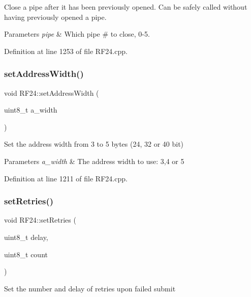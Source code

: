 Close a pipe after it has been previously opened. Can be safely called without having previously opened a pipe. 
\begin{DoxyParams}{Parameters}
{\em pipe} & Which pipe \# to close, 0-\/5. \\
\hline
\end{DoxyParams}


Definition at line 1253 of file R\+F24.\+cpp.

\mbox{\label{classRF24_ad5aea7f9a3bd9c7d357fb296ce751f21}} 
\subsubsection{\texorpdfstring{set\+Address\+Width()}{setAddressWidth()}}
{\footnotesize\ttfamily void R\+F24\+::set\+Address\+Width (\begin{DoxyParamCaption}\item[{uint8\+\_\+t}]{a\+\_\+width }\end{DoxyParamCaption})}

Set the address width from 3 to 5 bytes (24, 32 or 40 bit)


\begin{DoxyParams}{Parameters}
{\em a\+\_\+width} & The address width to use\+: 3,4 or 5 \\
\hline
\end{DoxyParams}


Definition at line 1211 of file R\+F24.\+cpp.

\mbox{\label{classRF24_a4c6d3959c8320e64568395f4ef507aef}} 
\subsubsection{\texorpdfstring{set\+Retries()}{setRetries()}}
{\footnotesize\ttfamily void R\+F24\+::set\+Retries (\begin{DoxyParamCaption}\item[{uint8\+\_\+t}]{delay,  }\item[{uint8\+\_\+t}]{count }\end{DoxyParamCaption})}

Set the number and delay of retries upon failed submit


